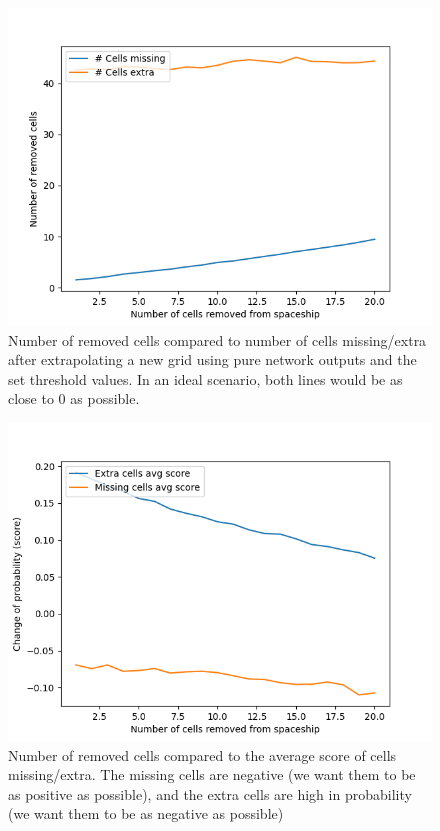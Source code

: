 \documentclass{l4proj}
\begin{document}
\begin{figure}[h!]
\centering
\includegraphics[width=0.8\linewidth]{dissertation/images/graphs/cells_removed_n_cells_extra_missing_probability_analysis.png}
\caption{Number of removed cells compared to number of cells missing/extra after extrapolating a new grid using pure network outputs and the set threshold values. In an ideal scenario, both lines would be as close to 0 as possible.}
\label{fig:subim1}
\end{figure}

\begin{figure}[h!]
\centering
\includegraphics[width=0.8\linewidth]{dissertation/images/graphs/cells_added_n_cells_extra_missing_probability_score_analysis.png}
\caption{Number of removed cells compared to the average score of cells missing/extra. The missing cells are negative (we want them to be as positive as possible), and the extra cells are high in probability (we want them to be as negative as possible)}
\label{fig:subim1}
\end{figure}
\end{document}
